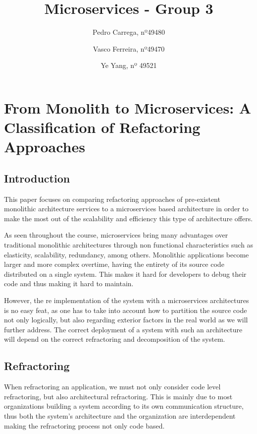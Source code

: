 \documentclass[14pt]{extarticle}
\date{}
\begin{document}
\title{Microservices - Group 3}
\author{Pedro Carrega, nº49480 \and
Vasco Ferreira, nº49470 \and Ye Yang, nº 49521
}
\maketitle
\tableofcontents
\newpage
\section{From Monolith to Microservices: A Classification of Refactoring Approaches}
\subsection{Introduction}
This paper focuses on comparing refactoring approaches of pre-existent monolithic architecture services to a microservices based architecture in order to make the most out of the scalability and efficiency this type of architecture offers.

As seen throughout the course, microservices bring many advantages over traditional monolithic architectures through non functional characteristics such as elasticity, scalability, redundancy, among others.
Monolithic applications become larger and more complex overtime, having the entirety of its source code distributed on a single system. This makes it hard for developers to debug their code and thus making it hard to maintain.

However, the re implementation of the system with a microservices architectures is no easy feat, as one has to take into account how to partition the source code not only logically, but also regarding exterior factors in the real world as we will further address. The correct deployment of a system with such an architecture will depend on the correct refractoring and decomposition of the system.

\subsection{Refractoring}
When refractoring an application, we must not only consider code level refractoring, but also architectural refractoring. This is mainly due to most organizations building a system according to its own communication structure, thus both the system's architecture and the organization are interdependent making the refractoring process not only code based.
\end{document}
